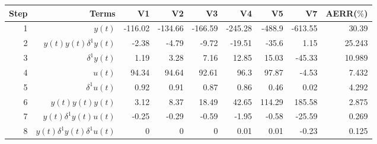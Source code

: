 \begin{tabular}{rrrrrrrrr}
Step & Terms & V1 & V2 & V3 & V4 & V5 & V7 & AERR($\%$) \\ 
\hline 
1 & $y(t)$ & -116.02 & -134.66 & -166.59 & -245.28 & -488.9 & -613.55 & 30.39 \\ 
2 & $y(t)y(t)\delta^1 y(t)$ & -2.38 & -4.79 & -9.72 & -19.51 & -35.6 & 1.15 & 25.243 \\ 
3 & $\delta^1 y(t)$ & 1.19 & 3.28 & 7.16 & 12.85 & 15.03 & -45.33 & 10.989 \\ 
4 & $u(t)$ & 94.34 & 94.64 & 92.61 & 96.3 & 97.87 & -4.53 & 7.432 \\ 
5 & $\delta^1 u(t)$ & 0.92 & 0.91 & 0.87 & 0.86 & 0.46 & 0.02 & 4.292 \\ 
6 & $y(t)y(t)y(t)$ & 3.12 & 8.37 & 18.49 & 42.65 & 114.29 & 185.58 & 2.875 \\ 
7 & $y(t)\delta^1 y(t)u(t)$ & -0.25 & -0.29 & -0.59 & -1.95 & -0.58 & -25.59 & 0.269 \\ 
8 & $y(t)\delta^1 y(t)\delta^1 u(t)$ & 0 & 0 & 0 & 0.01 & 0.01 & -0.23 & 0.125 \\ 
\hline 
\end{tabular}